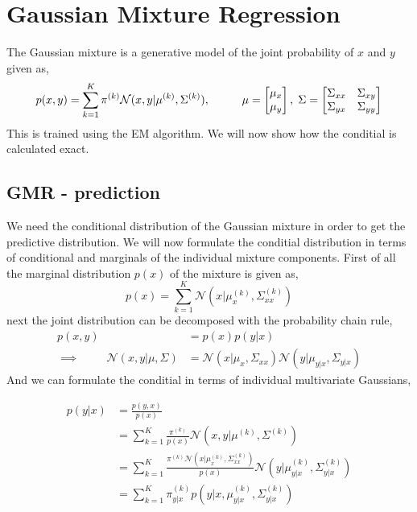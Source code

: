 \section{Gaussian Mixture Regression}
The Gaussian mixture is a generative model of the joint probability of $x$ and $y$ given as, 
$$p(x,y)= \sum_{k=1}^K \pi^{(k)} \mathcal{N}(x,y|\mu^{(k)},\Sigma^{(k)}), 
\hspace{1cm} \mu=\begin{bmatrix}
    \mu_x \\ \mu_y
\end{bmatrix},\hspace{0.1cm} \Sigma = \begin{bmatrix}
    \Sigma_{xx} & \Sigma_{xy}\\ \Sigma_{yx}& \Sigma_{yy}
\end{bmatrix}$$
This is trained using the EM algorithm. We will now show how the conditial is
calculated exact. 
\subsection{GMR - prediction}
We need the conditional distribution of the Gaussian mixture
in order to get the predictive distribution. We will now formulate
the conditial distribution in terms of conditional and marginals of
the individual mixture components. First of all the marginal distribution $p(x)$ 
of the mixture is given as, 
$$p(x) = \sum_{k=1}^K \mathcal{N}(x|\mu_{x}^{(k)},\Sigma_{xx}^{(k)})$$ 
next the joint distribution can be decomposed with the probability chain rule,
\begin{align*}
    p(x,y) &= p(x)p(y|x)\\
    \implies \hspace{1cm} \mathcal{N}(x,y|\mu,\Sigma) &= 
    \mathcal{N}(x|\mu_{x},\Sigma_{xx}) \mathcal{N}(y|\mu_{y|x},\Sigma_{y|x})
\end{align*} 
And we can formulate the conditial in terms of individual multivariate Gaussians, 

\begin{align}
    p(y|x) &= \frac{p(y,x)}{p(x)}\\
    &= \sum_{k=1}^K \frac{\pi^{(k)}}{p(x)} \mathcal{N}(x,y|\mu^{(k)},\Sigma^{(k)})\\
    &=  \sum_{k=1}^K \frac{\pi^{(k)} \mathcal{N}(x|\mu_{x}^{(k)},\Sigma_{xx}^{(k)})}{p(x)}\mathcal{N}(y|\mu_{y|x}^{(k)},\Sigma_{y|x}^{(k)})\\
    &=  \sum_{k=1}^K \pi_{y|x}^{(k)} p(y|x,\mu_{y|x}^{(k)},\Sigma_{y|x}^{(k)})
\end{align}

